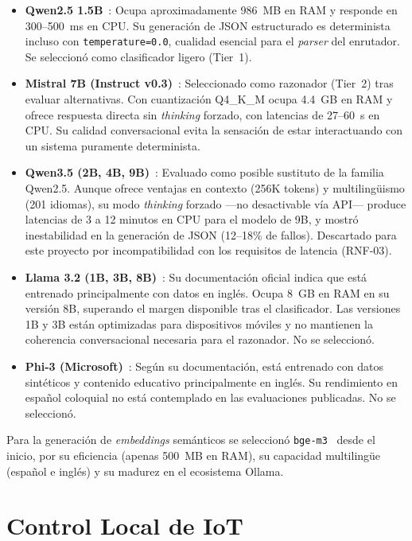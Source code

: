 \begin{itemize}
    \item \textbf{Qwen2.5 1.5B}~\cite{hui_qwen25_coder_2024}: Ocupa aproximadamente 986~MB en RAM y responde en 300--500~ms en CPU. Su generación de JSON estructurado es determinista incluso con \texttt{temperature=0.0}, cualidad esencial para el \textit{parser} del enrutador. Se seleccionó como clasificador ligero (Tier~1).
    \item \textbf{Mistral 7B (Instruct v0.3)}~\cite{mistral_7b}: Seleccionado como razonador (Tier~2) tras evaluar alternativas. Con cuantización Q4\_K\_M ocupa 4.4~GB en RAM y ofrece respuesta directa sin \textit{thinking} forzado, con latencias de 27--60~s en CPU. Su calidad conversacional evita la sensación de estar interactuando con un sistema puramente determinista.
    \item \textbf{Qwen3.5 (2B, 4B, 9B)}~\cite{qwen3_5}: Evaluado como posible sustituto de la familia Qwen2.5. Aunque ofrece ventajas en contexto (256K tokens) y multilingüismo (201 idiomas), su modo \textit{thinking} forzado ---no desactivable vía API--- produce latencias de 3 a 12 minutos en CPU para el modelo de 9B, y mostró inestabilidad en la generación de JSON (12--18\% de fallos). Descartado para este proyecto por incompatibilidad con los requisitos de latencia (RNF-03).
    \item \textbf{Llama 3.2 (1B, 3B, 8B)}~\cite{llama32}: Su documentación oficial indica que está entrenado principalmente con datos en inglés. Ocupa 8~GB en RAM en su versión 8B, superando el margen disponible tras el clasificador. Las versiones 1B y 3B están optimizadas para dispositivos móviles y no mantienen la coherencia conversacional necesaria para el razonador. No se seleccionó.
    \item \textbf{Phi-3 (Microsoft)}~\cite{phi3}: Según su documentación, está entrenado con datos sintéticos y contenido educativo principalmente en inglés. Su rendimiento en español coloquial no está contemplado en las evaluaciones publicadas. No se seleccionó.
\end{itemize}

Para la generación de \textit{embeddings} semánticos se seleccionó \texttt{bge-m3}~\cite{bge_m3} desde el inicio, por su eficiencia (apenas 500~MB en RAM), su capacidad multilingüe (español e inglés) y su madurez en el ecosistema Ollama.

\section{Control Local de IoT}

